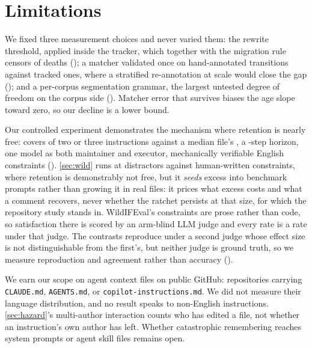 \section*{Limitations}
We fixed three measurement choices and never varied them: the \RewriteFracThreshold{} rewrite threshold,
applied inside the tracker, which together with the migration rule censors \FieldCensoredDeathShare{} of
deaths (); a matcher validated once on \GateBPool{} hand-annotated transitions
against \FieldMatches{} tracked ones, where a stratified re-annotation at scale would close the gap
(); and a per-corpus segmentation grammar, the largest untested degree of
freedom on the corpus side (). Matcher error that survives biases the age slope
toward zero, so our decline is a lower bound.

Our controlled experiment demonstrates the mechanism where retention is nearly free: covers of two or three
instructions against a median file's \FieldOpMedian{}, a \LabT{}-step horizon, one model as both maintainer
and executor, mechanically verifiable English constraints (). \autoref{sec:wild}
runs at \WildDistractors{} distractors against \WildCover{} human-written constraints, where retention is
demonstrably not free, but it \emph{seeds} excess into benchmark prompts rather than growing it in real
files: it prices what excess costs and what a comment recovers, never whether the ratchet persists at
that size, for which the repository study stands in. WildIFEval's constraints are prose rather than code, so
satisfaction there is scored by an arm-blind LLM judge and every rate is a rate under that judge. The
contrasts reproduce under a second judge whose effect size is not distinguishable from the first's, but
neither judge is ground truth, so we measure reproduction and agreement rather than accuracy
().

We earn our scope on agent context files on public GitHub: \FieldRepos{} repositories carrying
\texttt{CLAUDE.md}, \texttt{AGENTS.md}, or \texttt{copilot-instructions.md}. We did not measure their
language distribution, and no result speaks to non-English instructions. \autoref{sec:hazard}'s multi-author
interaction counts who has edited a file, not whether an instruction's own author has left. Whether
catastrophic remembering reaches system prompts or agent skill files remains open.
